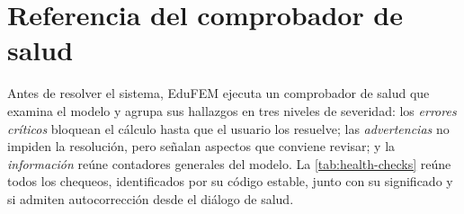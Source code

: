 \section{Referencia del comprobador de salud}
\label{sec:health-checks}

Antes de resolver el sistema, EduFEM ejecuta un comprobador de salud que examina el modelo y agrupa sus hallazgos en tres niveles de severidad: los \emph{errores críticos} bloquean el cálculo hasta que el usuario los resuelve; las \emph{advertencias} no impiden la resolución, pero señalan aspectos que conviene revisar; y la \emph{información} reúne contadores generales del modelo. La \autoref{tab:health-checks} reúne todos los chequeos, identificados por su código estable, junto con su significado y si admiten autocorrección desde el diálogo de salud.

